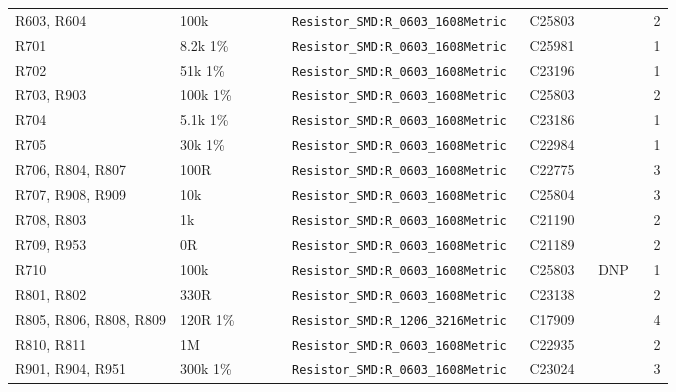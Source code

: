 {\begin{longtable}{@{}>{\raggedright\arraybackslash}p{0.25\linewidth}>{\raggedright\arraybackslash}p{0.17\linewidth}>{\raggedright\arraybackslash}p{0.36\linewidth}l l r@{}}
R603, R604 & 100k & \texttt{Resistor\_\allowbreak{}SMD:\allowbreak{}R\_\allowbreak{}0603\_\allowbreak{}1608Metric} & C25803 &  & 2\\
R701 & 8.2k 1\% & \texttt{Resistor\_\allowbreak{}SMD:\allowbreak{}R\_\allowbreak{}0603\_\allowbreak{}1608Metric} & C25981 &  & 1\\
R702 & 51k 1\% & \texttt{Resistor\_\allowbreak{}SMD:\allowbreak{}R\_\allowbreak{}0603\_\allowbreak{}1608Metric} & C23196 &  & 1\\
R703, R903 & 100k 1\% & \texttt{Resistor\_\allowbreak{}SMD:\allowbreak{}R\_\allowbreak{}0603\_\allowbreak{}1608Metric} & C25803 &  & 2\\
R704 & 5.1k 1\% & \texttt{Resistor\_\allowbreak{}SMD:\allowbreak{}R\_\allowbreak{}0603\_\allowbreak{}1608Metric} & C23186 &  & 1\\
R705 & 30k 1\% & \texttt{Resistor\_\allowbreak{}SMD:\allowbreak{}R\_\allowbreak{}0603\_\allowbreak{}1608Metric} & C22984 &  & 1\\
R706, R804, R807 & 100R & \texttt{Resistor\_\allowbreak{}SMD:\allowbreak{}R\_\allowbreak{}0603\_\allowbreak{}1608Metric} & C22775 &  & 3\\
R707, R908, R909 & 10k & \texttt{Resistor\_\allowbreak{}SMD:\allowbreak{}R\_\allowbreak{}0603\_\allowbreak{}1608Metric} & C25804 &  & 3\\
R708, R803 & 1k & \texttt{Resistor\_\allowbreak{}SMD:\allowbreak{}R\_\allowbreak{}0603\_\allowbreak{}1608Metric} & C21190 &  & 2\\
R709, R953 & 0R & \texttt{Resistor\_\allowbreak{}SMD:\allowbreak{}R\_\allowbreak{}0603\_\allowbreak{}1608Metric} & C21189 &  & 2\\
R710 & 100k & \texttt{Resistor\_\allowbreak{}SMD:\allowbreak{}R\_\allowbreak{}0603\_\allowbreak{}1608Metric} & C25803 & DNP & 1\\
R801, R802 & 330R & \texttt{Resistor\_\allowbreak{}SMD:\allowbreak{}R\_\allowbreak{}0603\_\allowbreak{}1608Metric} & C23138 &  & 2\\
R805, R806, R808, R809 & 120R 1\% & \texttt{Resistor\_\allowbreak{}SMD:\allowbreak{}R\_\allowbreak{}1206\_\allowbreak{}3216Metric} & C17909 &  & 4\\
R810, R811 & 1M & \texttt{Resistor\_\allowbreak{}SMD:\allowbreak{}R\_\allowbreak{}0603\_\allowbreak{}1608Metric} & C22935 &  & 2\\
R901, R904, R951 & 300k 1\% & \texttt{Resistor\_\allowbreak{}SMD:\allowbreak{}R\_\allowbreak{}0603\_\allowbreak{}1608Metric} & C23024 &  & 3\\

\end{longtable}}

